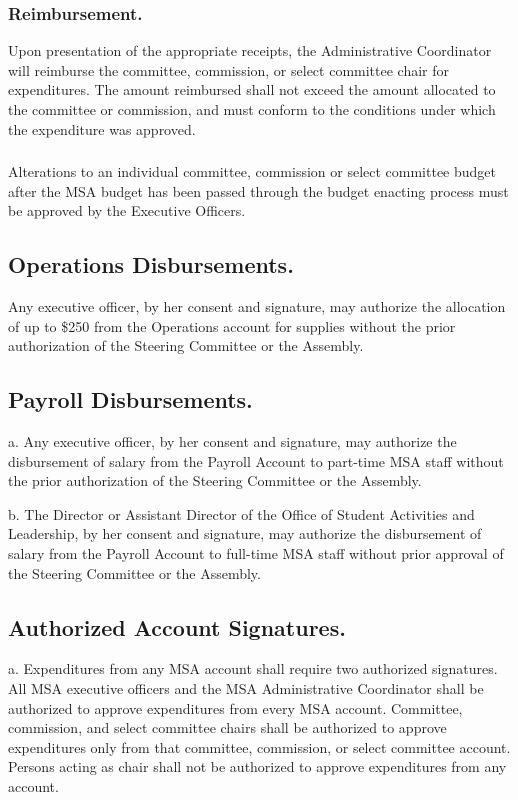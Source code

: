 \subsubsection{Reimbursement.}
Upon presentation of the appropriate receipts, the Administrative Coordinator will reimburse the committee, commission, or select committee chair for expenditures.  The amount reimbursed shall not exceed the amount allocated to the committee or commission, and must conform to the conditions under which the expenditure was approved.

\subsubsection{}
Alterations to an individual committee, commission or select committee budget after the MSA budget has been passed through the budget enacting process must be approved by the Executive Officers.


\subsection{Operations Disbursements.}
Any executive officer, by her consent and signature, may authorize the allocation of up to \$250 from the Operations account for supplies without the prior authorization of the Steering Committee or the Assembly.


\subsection{Payroll Disbursements.}  

a.	Any executive officer, by her consent and signature, may authorize the disbursement of salary from the Payroll Account to part-time MSA staff without the prior authorization of the Steering Committee or the Assembly.  

b.	The Director or Assistant Director of the Office of Student Activities and Leadership, by her consent and signature, may authorize the disbursement of salary from the Payroll Account to full-time MSA staff without prior approval of the Steering Committee or the Assembly.

\subsection{Authorized Account Signatures.}  

a.	Expenditures from any MSA account shall require two authorized signatures.  All MSA executive officers and the MSA Administrative Coordinator shall be authorized to approve expenditures from every MSA account.  Committee, commission, and select committee chairs shall be authorized to approve expenditures only from that committee, commission, or select committee account.  Persons acting as chair shall not be authorized to approve expenditures from any account.  

